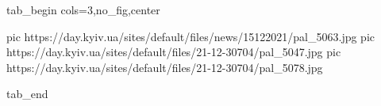  
 
 
 
 


\ifcmt
  tab_begin cols=3,no_fig,center

     pic https://day.kyiv.ua/sites/default/files/news/15122021/pal_5063.jpg
		 pic https://day.kyiv.ua/sites/default/files/21-12-30704/pal_5047.jpg
		 pic https://day.kyiv.ua/sites/default/files/21-12-30704/pal_5078.jpg

  tab_end
\fi
